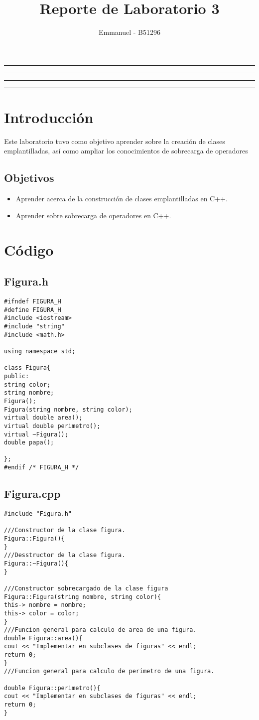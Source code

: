 \documentclass[11pt]{article}
\title{Reporte de Laboratorio 3}
\author{Emmanuel - B51296}
\begin{document}
\maketitle
\hrule
\hrule
\tableofcontents
\hspace{5mm}
\hrule
\hrule


\section{Introducción}
Este laboratorio tuvo como objetivo aprender sobre la creación de clases emplantilladas, así como ampliar los conocimientos de sobrecarga de operadores
\subsection{Objetivos}
\begin{itemize}
	\item Aprender acerca de la construcción de clases emplantilladas en C++.
	\item Aprender sobre sobrecarga de operadores en C++.
\end{itemize}

\section{Código}

\subsection{Figura.h}
\begin{lstlisting}
#ifndef FIGURA_H
#define FIGURA_H
#include <iostream>
#include "string"
#include <math.h> 

using namespace std;

class Figura{
public:
string color;
string nombre;
Figura();
Figura(string nombre, string color);
virtual double area();
virtual double perimetro();
virtual ~Figura();
double papa();

};
#endif /* FIGURA_H */

\end{lstlisting}

\subsection{Figura.cpp}
\begin{lstlisting}
#include "Figura.h"

///Constructor de la clase figura.
Figura::Figura(){
}
///Desstructor de la clase figura.
Figura::~Figura(){
}

///Constructor sobrecargado de la clase figura
Figura::Figura(string nombre, string color){
this-> nombre = nombre;
this-> color = color;
}
///Funcion general para calculo de area de una figura.
double Figura::area(){
cout << "Implementar en subclases de figuras" << endl;
return 0;
}
///Funcion general para calculo de perimetro de una figura.

double Figura::perimetro(){
cout << "Implementar en subclases de figuras" << endl;
return 0;
}


\end{lstlisting}
\end{document}
